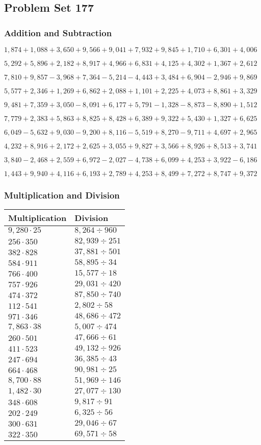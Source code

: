 \hypertarget{problem-set-177}{%
\subsection{Problem Set 177}\label{problem-set-177}}

\hypertarget{addition-and-subtraction}{%
\subsubsection{Addition and
Subtraction}\label{addition-and-subtraction}}

\(1,874+1,088+3,650+9,566+9,041+7,932+9,845+1,710+6,301+4,006\)

\(5,292+5,896+2,182+8,917+4,966+6,831+4,125+4,302+1,367+2,612\)

\(7,810+9,857-3,968+7,364-5,214-4,443+3,484+6,904-2,946+9,869\)

\(5,577+2,346+1,269+6,862+2,088+1,101+2,225+4,073+8,861+3,329\)

\(9,481+7,359+3,050-8,091+6,177+5,791-1,328-8,873-8,890+1,512\)

\(7,779+2,383+5,863+8,825+8,428+6,389+9,322+5,430+1,327+6,625\)

\(6,049-5,632+9,030-9,200+8,116-5,519+8,270-9,711+4,697+2,965\)

\(4,232+8,916+2,172+2,625+3,055+9,827+3,566+8,926+8,513+3,741\)

\(3,840-2,468+2,559+6,972-2,027-4,738+6,099+4,253+3,922-6,186\)

\(1,443+9,940+4,116+6,193+2,789+4,253+8,499+7,272+8,747+9,372\)

\hypertarget{multiplication-and-division}{%
\subsubsection{Multiplication and
Division}\label{multiplication-and-division}}

\begin{longtable}[]{@{}ll@{}}
\toprule
Multiplication & Division\tabularnewline
\midrule
\endhead
\(9,280\cdot25\) & \(8,264÷960\)\tabularnewline
\(256\cdot350\) & \(82,939÷251\)\tabularnewline
\(382\cdot828\) & \(37,881÷501\)\tabularnewline
\(584\cdot911\) & \(58,895÷34\)\tabularnewline
\(766\cdot400\) & \(15,577÷18\)\tabularnewline
\(757\cdot926\) & \(29,031÷420\)\tabularnewline
\(474\cdot372\) & \(87,850÷740\)\tabularnewline
\(112\cdot541\) & \(2,802÷58\)\tabularnewline
\(971\cdot346\) & \(48,686÷472\)\tabularnewline
\(7,863\cdot38\) & \(5,007÷474\)\tabularnewline
\(260\cdot501\) & \(47,666÷61\)\tabularnewline
\(411\cdot523\) & \(49,132÷926\)\tabularnewline
\(247\cdot694\) & \(36,385÷43\)\tabularnewline
\(664\cdot468\) & \(90,981÷25\)\tabularnewline
\(8,700\cdot88\) & \(51,969÷146\)\tabularnewline
\(1,482\cdot30\) & \(27,077÷130\)\tabularnewline
\(348\cdot608\) & \(9,817÷91\)\tabularnewline
\(202\cdot249\) & \(6,325÷56\)\tabularnewline
\(300\cdot631\) & \(29,046÷67\)\tabularnewline
\(322\cdot350\) & \(69,571÷58\)\tabularnewline
\bottomrule
\end{longtable}
